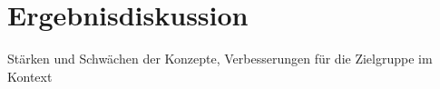 \section{Ergebnisdiskussion}
Stärken und Schwächen der Konzepte, Verbesserungen für die Zielgruppe im Kontext